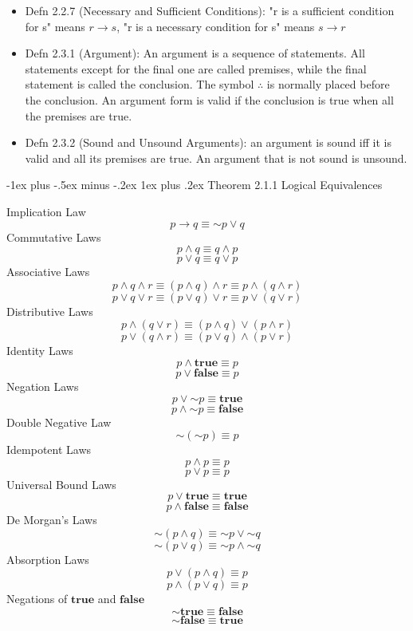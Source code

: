 \documentclass[10pt, portrait]{article}
\makeatletter
\renewcommand{\subsection}{\@startsection{subsection}{3}{0mm}%
                                {-1ex plus -.5ex minus -.2ex}%
                                {1ex plus .2ex}%
                                {\normalfont\small\bfseries}}%
\renewcommand{\lnot}{\mathord{\sim}}
\makeatother
\begin{document}
\begin{multicols*}{2}
\begin{itemize}
    \item Defn 2.2.7 (Necessary and Sufficient Conditions): "r is a sufficient condition for s" means $r \rightarrow s$, "r is a necessary condition for s" means $s \rightarrow r$
    \item Defn 2.3.1 (Argument): An argument is a sequence of statements. All statements except for the final one are called premises, while the final statement is called the conclusion. The symbol $\therefore$ is normally placed before the conclusion. An argument form is valid if the conclusion is true when all the premises are true.
    \item Defn 2.3.2 (Sound and Unsound Arguments): an argument is sound iff it is valid and all its premises are true. An argument that is not sound is unsound.
\end{itemize}

\subsection{Theorem 2.1.1 Logical Equivalences}
\begin{multicols*}{2}
Implication Law
$$p \rightarrow q \equiv \lnot p \lor q$$
Commutative Laws
  $$ p \land q \equiv q \land p $$
  $$ p \lor  q \equiv q \lor  p $$
Associative Laws
  $$ p \land q \land r \equiv (p \land q) \land r \equiv p \land (q \land r) $$
  $$ p \lor q \lor r \equiv (p \lor  q) \lor  r \equiv p \lor  (q \lor  r) $$
Distributive Laws
  $$ p \land (q \lor  r) \equiv (p \land q) \lor  (p \land r) $$
  $$ p \lor  (q \land r) \equiv (p \lor  q) \land (p \lor  r) $$
Identity Laws
  $$ p \land \textbf{true} \equiv p $$
  $$ p \lor  \textbf{false} \equiv p $$
Negation Laws
  $$ p \lor  \lnot p \equiv \textbf{true} $$
  $$ p \land \lnot p \equiv \textbf{false} $$
Double Negative Law
  $$ \lnot ( \lnot p ) \equiv p $$
Idempotent Laws
  $$ p \land p \equiv p $$
  $$ p \lor  p \equiv p $$
Universal Bound Laws
  $$ p \lor  \textbf{true} \equiv \textbf{true} $$
  $$ p \land \textbf{false} \equiv \textbf{false} $$
De Morgan's Laws
  $$ \lnot ( p \land q ) \equiv \lnot p \lor  \lnot q $$
  $$ \lnot ( p \lor  q ) \equiv \lnot p \land \lnot q $$
Absorption Laws
  $$ p \lor  (p \land q) \equiv p $$
  $$ p \land (p \lor  q) \equiv p $$
Negations of $\textbf{true}$ and $\textbf{false}$
  $$ \lnot \textbf{true} \equiv \textbf{false} $$
  $$ \lnot \textbf{false} \equiv \textbf{true} $$
\end{multicols*}


\end{multicols*}
\end{document}
